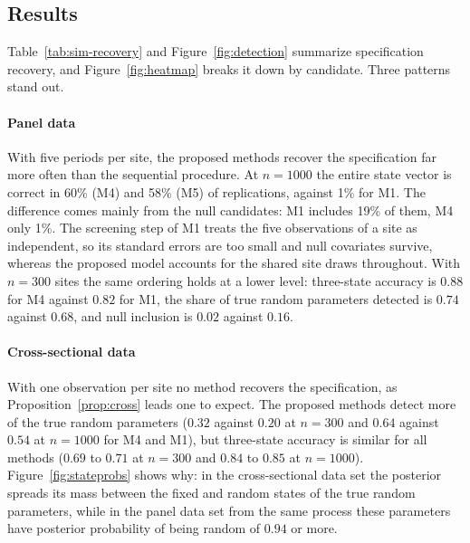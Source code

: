 \subsection{Results}

Table~\ref{tab:sim-recovery} and Figure~\ref{fig:detection} summarize specification recovery, and Figure~\ref{fig:heatmap} breaks it down by candidate. Three patterns stand out.

\paragraph{Panel data} With five periods per site, the proposed methods recover the specification far more often than the sequential procedure. At $n=1000$ the entire state vector is correct in 60\% (M4) and 58\% (M5) of replications, against 1\% for M1. The difference comes mainly from the null candidates: M1 includes 19\% of them, M4 only 1\%. The screening step of M1 treats the five observations of a site as independent, so its standard errors are too small and null covariates survive, whereas the proposed model accounts for the shared site draws throughout. With $n=300$ sites the same ordering holds at a lower level: three-state accuracy is $0.88$ for M4 against $0.82$ for M1, the share of true random parameters detected is $0.74$ against $0.68$, and null inclusion is $0.02$ against $0.16$.

\paragraph{Cross-sectional data} With one observation per site no method recovers the specification, as Proposition~\ref{prop:cross} leads one to expect. The proposed methods detect more of the true random parameters ($0.32$ against $0.20$ at $n=300$ and $0.64$ against $0.54$ at $n=1000$ for M4 and M1), but three-state accuracy is similar for all methods ($0.69$ to $0.71$ at $n=300$ and $0.84$ to $0.85$ at $n=1000$). Figure~\ref{fig:stateprobs} shows why: in the cross-sectional data set the posterior spreads its mass between the fixed and random states of the true random parameters, while in the panel data set from the same process these parameters have posterior probability of being random of $0.94$ or more.


